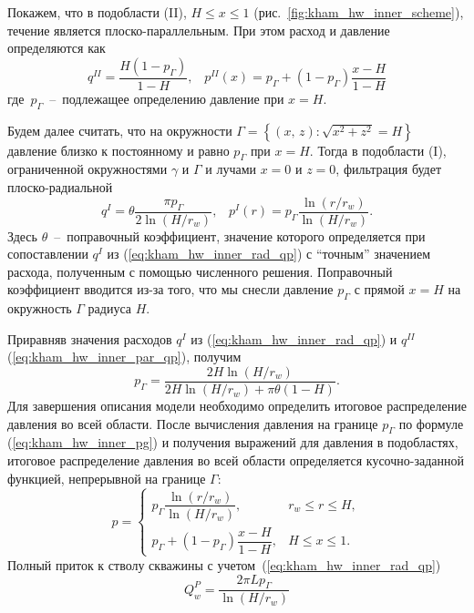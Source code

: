 \documentclass{article}
\begin{document}
Покажем, что в подобласти (II), $H \leq x \leq 1$ (рис.~\ref{fig:kham_hw_inner_scheme}), течение является плоско-параллельным.
При этом расход и давление определяются как
\begin{equation}
  \displaystyle
  q^{II} = \dfrac{H \left(1-p_{\Gamma}\right)}{1-H}, \;\;\;
  p^{II}(x) = p_{\Gamma} + (1 - p_{\Gamma})\dfrac{x - H}{1-H}
  \label{eq:kham_hw_inner_par_qp}
\end{equation}
где~$p_{\Gamma}$~--~подлежащее определению давление при $x=H$.

Будем далее считать, что на окружности
$\Gamma=\left\{\left(x,\, z\right): \sqrt{x^2 + z^2} = H \right\}$
давление близко к постоянному и равно $p_{\Gamma}$ при $x=H$.
Тогда в подобласти (I), ограниченной окружностями $\gamma$ и $\Gamma$ и
лучами $x = 0$ и $z = 0$, фильтрация будет плоско-радиальной
\begin{equation}
  \displaystyle
  q^I = \theta \dfrac{\pi p_{\Gamma}}{2 \ln{\left(H/r_w\right)}}, \;\;\;
  p^I(r) = p_{\Gamma} \dfrac{\ln{\left(r/r_w\right)}}{\ln{\left(H/r_w\right)}}.
  \label{eq:kham_hw_inner_rad_qp}
\end{equation}
Здесь $\theta$~--~поправочный коэффициент, значение которого определяется
при сопоставлении $q^I$ из (\ref{eq:kham_hw_inner_rad_qp}) с ``точным''
значением расхода, полученным с помощью численного решения. Поправочный
коэффициент вводится из-за того, что мы снесли давление $p_{\Gamma}$ с прямой $x= H$
на окружность $\Gamma$ радиуса $H$.

Приравняв значения расходов $q^I$ из (\ref{eq:kham_hw_inner_rad_qp})
и $q^{II}$ (\ref{eq:kham_hw_inner_par_qp}), получим
\begin{equation}
  \displaystyle
  p_{\Gamma} = \dfrac{2 H \ln{\left(H/r_w\right)}}{2 H \ln{\left(H/r_w\right)
  + \pi \theta \left(1 - H\right)}}.
  \label{eq:kham_hw_inner_pg}
\end{equation}
Для завершения описания модели необходимо определить итоговое распределение
давления во всей области. После вычисления давления на
границе $p_{\Gamma}$ по формуле (\ref{eq:kham_hw_inner_pg}) и получения
выражений для давления в подобластях, итоговое распределение давления во всей
области определяется кусочно-заданной функцией, непрерывной на границе $\Gamma$:
\begin{equation}
  p =
  \begin{cases}
    p_{\Gamma} \dfrac{\ln{\left(r/r_w\right)}}{\ln{\left(H/r_w\right)}}, & r_w \leq r \leq H, \\
    p_{\Gamma} + (1 - p_{\Gamma})\dfrac{x - H}{1-H}, & H \leq x \leq 1.
  \end{cases}
  \label{eq:kham_hw_inner_total_pressure}
\end{equation}
Полный приток к стволу скважины с учетом~(\ref{eq:kham_hw_inner_rad_qp})
\begin{equation}
  \displaystyle
  Q_w^P = \dfrac{2\pi L p_{\Gamma}}{\ln{\left(H/r_w\right)}}
  \label{eq:kham_hw_inner_Q}
\end{equation}
\end{document}
